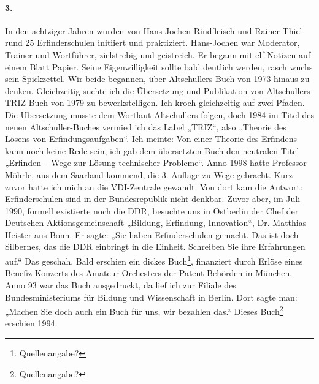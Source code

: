 \documentclass[12pt,a4paper]{article}
\begin{document}
\paragraph{3.}
In den achtziger Jahren wurden von Hans-Jochen Rindfleisch und Rainer Thiel
rund 25 Erfinderschulen initiiert und praktiziert. Hans-Jochen war Moderator,
Trainer und Wortführer, zielstrebig und geistreich. Er begann mit elf Notizen
auf einem Blatt Papier. Seine Eigenwilligkeit sollte bald deutlich werden,
rasch wuchs sein Spickzettel. Wir beide begannen, über Altschullers Buch von
1973 hinaus zu denken. Gleichzeitig suchte ich die Übersetzung und Publikation
von Altschullers TRIZ-Buch von 1979 zu bewerkstelligen. Ich kroch gleichzeitig
auf zwei Pfaden. Die Übersetzung musste dem Wortlaut Altschullers folgen, doch
1984 im Titel des neuen Altschuller-Buches vermied ich das Label „TRIZ“, also
„Theorie des Lösens von Erfindungsaufgaben“. Ich meinte: Von einer Theorie des
Erfindens kann noch keine Rede sein, ich gab dem übersetzten Buch den
neutralen Titel „Erfinden – Wege zur Lösung technischer Probleme“. Anno 1998
hatte Professor Möhrle, aus dem Saarland kommend, die 3. Auflage zu Wege
gebracht. Kurz zuvor hatte ich mich an die VDI-Zentrale gewandt. Von dort kam
die Antwort: Erfinderschulen sind in der Bundesrepublik nicht denkbar.  Zuvor
aber, im Juli 1990, formell existierte noch die DDR, besuchte uns in Ostberlin
der Chef der Deutschen Aktionsgemeinschaft „Bildung, Erfindung, Innovation“,
Dr. Matthias Heister aus Bonn. Er sagte: „Sie haben Erfinderschulen gemacht.
Das ist doch Silbernes, das die DDR einbringt in die Einheit.  Schreiben Sie
ihre Erfahrungen auf.“ Das geschah. Bald erschien ein dickes
Buch\footnote{Quellenangabe?}, finanziert durch Erlöse eines Benefiz-Konzerts
des Amateur-Orchesters der Patent-Behörden in München. Anno 93 war das Buch
ausgedruckt, da lief ich zur Filiale des Bundesministeriums für Bildung und
Wissenschaft in Berlin.  Dort sagte man: „Machen Sie doch auch ein Buch für
uns, wir bezahlen das.“ Dieses Buch\footnote{Quellenangabe?}  erschien 1994.
\end{document}
